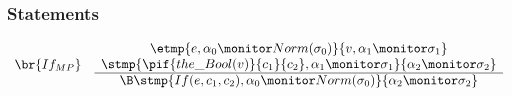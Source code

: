 \subsubsection*{Statements}

\begin{displaymath}
\begin{array}{lc}
\br{If_{MP}} &
\begin{array}{c}
\etmp{e, \alpha_0 \monitor Norm(\sigma_0)}{v,\alpha_1 \monitor \sigma_1}\\
\stmp{\pif{the\_Bool(v)}{c_1}{c_2}, \alpha_1 \monitor \sigma_1}{\alpha_2 \monitor \sigma_2}\\
\hline
\B \stmp{If(e,c_1,c_2), \alpha_0 \monitor Norm(\sigma_0)}{\alpha_2 \monitor \sigma_2}
\end{array}\\
\end{array}
\end{displaymath}


